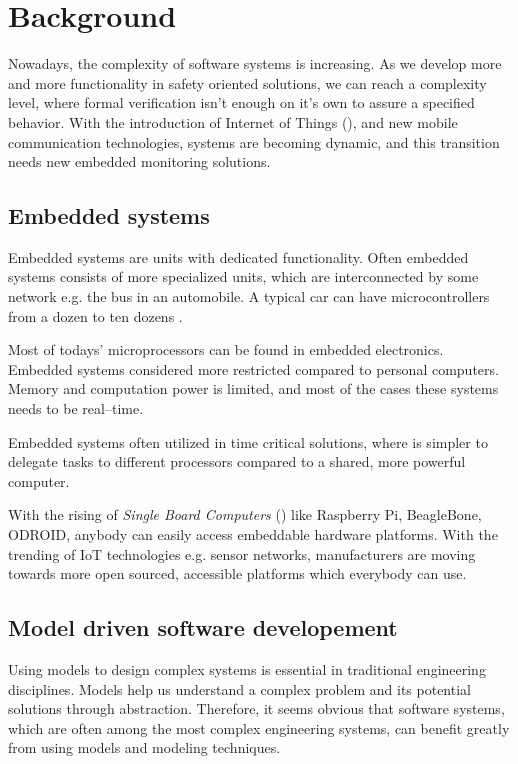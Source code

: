 \chapter{Background}
\label{chap:background}

Nowadays, the complexity of software systems is increasing. As we develop more and more functionality in safety oriented solutions, we can reach a complexity level, where formal verification isn't enough on it's own to assure a specified behavior. With the introduction of Internet of Things (\iot), and new mobile communication technologies, systems are becoming dynamic, and this transition needs new embedded monitoring solutions.

\section{Embedded systems}

Embedded systems are units with dedicated functionality. Often embedded systems consists of more specialized units, which are interconnected by some network e.g. the  bus in an automobile. A typical car can have microcontrollers from a dozen to ten dozens \citep{VEHICLE_DYN}.

Most of todays' microprocessors can be found in embedded electronics. Embedded systems considered more restricted compared to personal computers. Memory and computation power is limited, and most of the cases these systems needs to be real--time.

Embedded systems often utilized in time critical solutions, where is simpler to delegate tasks to different processors compared to a shared, more powerful computer.

With the rising of \emph{Single Board Computers} () like Raspberry Pi, BeagleBone, ODROID, anybody can easily access embeddable hardware platforms. With the trending of IoT technologies e.g. sensor networks, manufacturers are moving towards more open sourced, accessible platforms which everybody can use.

\section{Model driven software developement}

Using models to design complex systems is essential in traditional engineering disciplines. Models help us understand a complex problem and its potential solutions through abstraction. Therefore, it seems obvious that software systems, which are often among the most complex engineering systems, can benefit greatly from using models and modeling techniques. \citep{pastor2008model}

